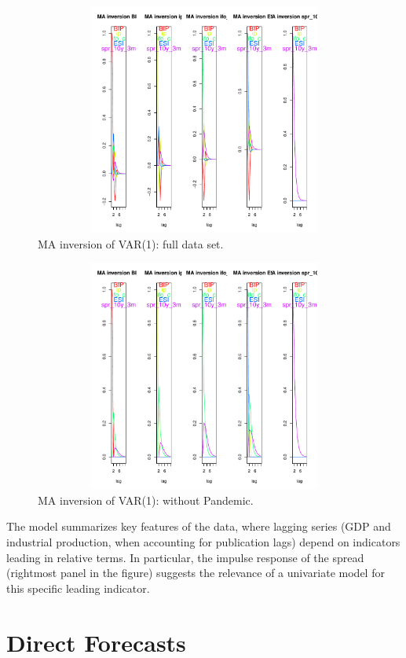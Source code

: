 \documentclass[a4paper]{article}
\begin{document}
\begin{figure}[H]\begin{center}\includegraphics[height=3in, width=4.5in]{./Figures/ma_inv_multi_ip.pdf}\caption{MA inversion of VAR(1): full data set.\label{impulse}}\end{center}\end{figure}\begin{figure}[H]\begin{center}\includegraphics[height=3in, width=4.5in]{./Figures/ma_inv_multi_ip_wc.pdf}\caption{MA inversion of VAR(1): without Pandemic.\label{impulse_wc}}\end{center}\end{figure}The model summarizes key features of the data, where lagging series (GDP and industrial production, when accounting for publication lags) depend on  indicators leading in relative terms. In particular, the impulse response of the spread (rightmost panel in the figure) suggests the relevance of a univariate model for this specific leading indicator.


\section{Direct Forecasts}\label{direct_forecast}
\end{document}

